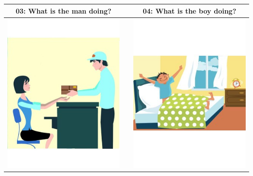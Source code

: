 \documentclass[12pt,notitlepage]{article}
\begin{document}
\begin{center}
\begin{tabular}{|c|c|c|}
\hline
03: What is the man doing? && 04: What is the boy doing? \\
\hline
\includegraphics[width=20em,trim=0 0 0 -3]{figures/I03.jpg} & & \includegraphics[width=20em,trim=0 0 0 -3]{figures/I04.jpg} \\
\hline
\end{tabular}
\vspace{1em} \\



\end{center}
\end{document}
